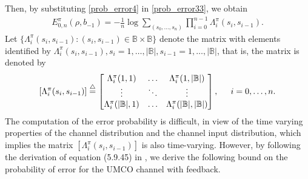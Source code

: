 \documentclass[11pt, a4paper, journal,onecolumn]{IEEEtran}
\newcommand{\mb}{\mathbb}
\newcommand{\sr}{\stackrel}
\newcommand{\tri}{\sr{\triangle}{=}}
\newcommand{\bea}{\begin{eqnarray}}
\newcommand{\eea}{\end{eqnarray}}
\newcommand{\hst}{\hspace{.2in}}
\begin{document}
Then, by substituting \eqref{prob_error4} in \eqref{prob_error33}, we obtain
\bea
E^\pi_{0,n}\left(\rho,b_{-1}\right)
=-\frac{1}{n}\log{\sum_{(s_0, \ldots, s_n)}\prod_{i=0}^{n-1}\Lambda_i^\pi(s_i,s_{i-1})}. \label{prob_error5}
\eea
Let $\Big\{ \Lambda_i^\pi(s_i,s_{i-1}): (s_i, s_{i-1}) \in {\mb B} \times {\mb B}\Big\}$ denote the matrix with elements identified by $\Lambda_i^\pi(s_i,s_{i-1}),  s_i=1,\ldots, |{\mb B}|, s_{i-1}=1,\ldots, |{\mb B}|$, that is, the matrix is denoted by
\bea
\left[ \Lambda_i^\pi(s_i,s_{i-1})\right] \tri \begin{bmatrix}
\Lambda_i^\pi(1,1)		& \dots	 & \Lambda_i^\pi(1,|{\mb B}|)      \\
\vdots		& \ddots & \vdots \\
\Lambda_i^\pi(|{\mb B}|,1) 	& \dots 	 & \Lambda_i^\pi(|{\mb B}|,|{\mb B}|)
\end{bmatrix}, \hst i=0, \ldots, n.
\eea
The computation of the error probability is difficult, in view of the time varying properties of the channel distribution and the channel input distribution, which implies the matrix  $\left[ \Lambda_i^\pi(s_i,s_{i-1})\right]$ is also time-varying. However, by following the derivation of equation (5.9.45) in \cite{gallager}, we derive the following bound on the probability of error for the UMCO channel with feedback.\\
\end{document}
